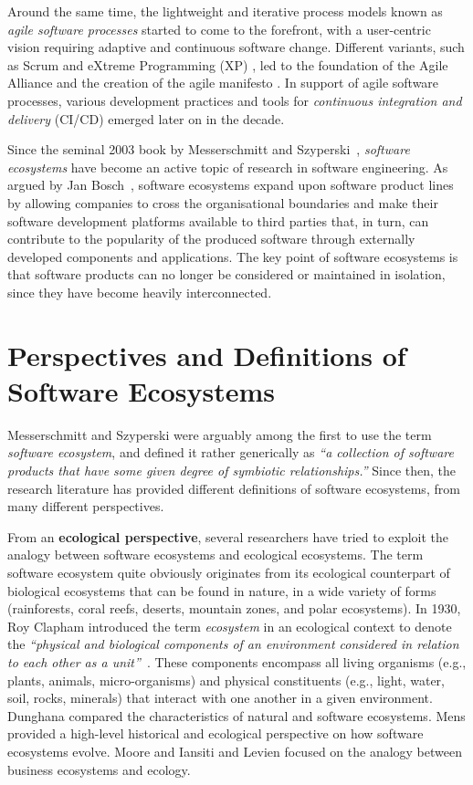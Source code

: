 Around the same time, the lightweight and iterative process models known as \emph{agile software processes} started to come to the forefront, with a user-centric vision requiring adaptive and continuous software change.
Different variants, such as Scrum \cite{Schwaber1997} and eXtreme Programming (XP) \cite{Beck1999}, led to the foundation of the Agile Alliance and the creation of the agile manifesto \cite{beck2001manifesto}.
In support of agile software processes, various development practices and tools for \emph{continuous integration and delivery} (CI/CD) emerged later on in the decade.

Since the seminal 2003 book by Messerschmitt and Szyperski~\cite{messerschmitt2003software}, \emph{software ecosystems} have become an active topic of research in software engineering.
As argued by Jan Bosch~\cite{Bosch2009,Bosch2010}, software ecosystems expand upon software product lines by allowing companies to cross the organisational boundaries and make their software development platforms available to third parties that, in turn, can contribute to the popularity of the produced software through externally developed components and applications.
The key point of software ecosystems is that software products can no longer be considered or maintained in isolation, since they have become heavily interconnected.


\section{Perspectives and Definitions of Software Ecosystems}
\label{INT:sec:definition}

Messerschmitt and Szyperski \cite{messerschmitt2003software} were arguably among the first to use the term \emph{software ecosystem}, and defined it rather generically as \emph{``a collection of software products that have some given degree of symbiotic relationships.''} Since then, the research literature has provided different definitions of software ecosystems, from many different perspectives.

From an \textbf{ecological perspective}, several researchers have tried to exploit the analogy between software ecosystems and ecological ecosystems.
The term software ecosystem quite obviously originates from its ecological counterpart of biological ecosystems that can be found in nature, in a wide variety of forms (\eg rainforests, coral reefs, deserts, mountain zones, and polar ecosystems).
In 1930, Roy Clapham introduced the term \emph{ecosystem} in an ecological context to denote the \emph{``physical and biological components of an environment considered in relation to each other as a unit''}~\cite{Willis1997}.
These components encompass all living organisms (e.g., plants, animals, micro-organisms) and physical constituents (e.g., light, water, soil, rocks, minerals) that interact with one another in a given environment.
Dunghana \etal \cite{Dhungana2013} compared the characteristics of natural and software ecosystems. Mens \cite{Mens2015} provided a high-level historical and ecological perspective on how software ecosystems evolve.
Moore \cite{Moore1993} and Iansiti and Levien \cite{Iansiti2004} focused on the analogy between business ecosystems and ecology.

